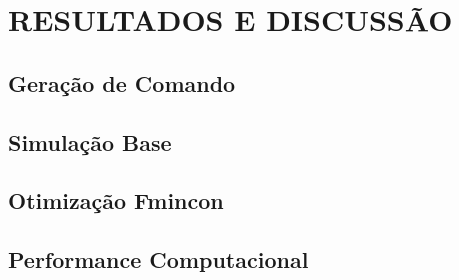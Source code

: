 \chapter{RESULTADOS E DISCUSSÃO}

\section{Geração de Comando}


\section{Simulação Base}

\section{Otimização Fmincon}

\section{Performance Computacional}






